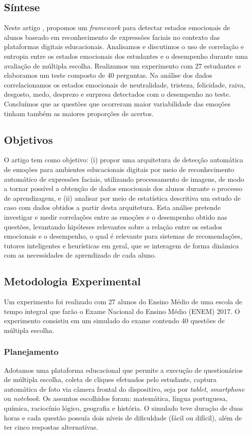 \subsection{Síntese}
Neste artigo \citep{cruz2017framework}, propomos um \textit{framework} para detectar estados emocionais de alunos baseado em reconhecimento de expressões faciais no contexto das plataformas digitais educacionais. Analisamos e discutimos o uso de correlação e entropia entre os estados emocionais dos estudantes e o desempenho durante uma avaliação de múltipla escolha. Realizamos um experimento com 27 estudantes e elaboramos um teste composto de 40 perguntas. Na análise dos dados correlacionamos os estados emocionais de neutralidade, tristeza, felicidade, raiva, desgosto, medo, desprezo e surpresa detectados com o desempenho no teste. Concluímos que as questões que ocorreram maior variabilidade das emoções tinham também as maiores proporções de acertos.

\subsection{Objetivos}
O artigo \citep{cruz2017framework} tem como objetivo: (i) propor uma arquitetura de detecção automática de emoções para ambientes educacionais digitais por meio de reconhecimento automático de expressões faciais, utilizando processamento de imagens, de modo a tornar possível a obtenção de dados emocionais dos alunos durante o processo de aprendizagem, e (ii) analisar por meio de estatística descritiva um estudo de caso com dados obtidos a partir desta arquitetura. Esta análise pretende investigar e medir correlações entre as emoções e o desempenho obtido nas questões, levantando hipóteses relevantes sobre a relação entre os estados emocionais e o desempenho, o qual é relevante para sistemas de recomendações, tutores inteligentes e heurísticas em geral, que se interagem de forma dinâmica com as necessidades de aprendizado de cada aluno.

\subsection{Metodologia Experimental}
Um experimento foi realizado com 27 alunos do Ensino Médio de uma escola de tempo integral que farão o Exame Nacional do Ensino Médio (ENEM) 2017. O experimento consistiu em um simulado do exame contendo 40 questões de múltipla escolha.

\subsubsection{Planejamento}\label{sec:plan}
Adotamos uma plataforma educacional que permite a execução de questionários de múltipla escolha, coleta de cliques efetuados pelo estudante, captura automática de foto via câmera frontal do dispositivo, seja por \textit{tablet}, \textit{smartphone} ou \textit{notebook}. Os assuntos escolhidos foram: matemática, língua portuguesa, química, raciocínio lógico, geografia e história. O simulado teve duração de duas horas e cada questão possuía dois níveis de dificuldade (fácil ou difícil), além de ter cinco respostas alternativas.

